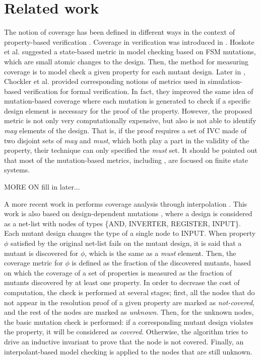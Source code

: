 \section{Related work}
\label{sec:related}

The notion of coverage has been defined in different ways in the context of property-based verification \cite{chockler2008causes, chockler2006coverage, chockler_coverage_2003, katz1999have, grosse2007estimating, claessen2007coverage}.
Coverage in verification was introduced in \cite{hoskote1999coverage, katz1999have}. Hoskote et al. \cite{hoskote1999coverage} suggested a state-based metric in model checking based on FSM mutations, which are small atomic changes to the design. Then, the method for measuring coverage is to model check a given property for each mutant design.
Later in \cite{chockler_coverage_2003}, Chockler et al. provided corresponding notions of metrics used in simulation-based verification for formal verification. In fact, they improved the same idea of mutation-based coverage where each mutation is generated to check if a specific
design element is necessary for the proof of the property.
 However, the proposed metric is not only very computationally expensive, but also is not able to identify \emph{may} elements of the design. That is, if the proof requires a set of IVC made of two disjoint sets of \emph{may} and \emph{must}, which both play a part in the validity of the property, their technique can only specified the \emph{must} set. It should be pointed out that most of the mutation-based metrics, including \cite{kupferman_theory_2008, chockler2001practical}, are focused on finite state systems.

 MORE ON \cite{Kupferman:2006:SCF} fill in later...

A more recent work in \cite{chockler2010coverage} performs coverage analysis through interpolation \cite{mcmillan2003interpolation}. This work is also based on design-dependent mutations \cite{chockler_coverage_2003}, where a design is considered as a net-list with nodes of types \{AND, INVERTER, REGISTER, INPUT\}. Each mutant design changes the type of a single node to INPUT. When property $\phi$ satisfied by the original net-list fails on the mutant design, it is said that a mutant is discovered for $\phi$, which is the same as a \emph{must} element.
Then, the coverage metric for $\phi$ is defined as the fraction of the discovered mutants, based on which the coverage of a set of properties is measured as the fraction of mutants discovered by at least one property.
In order to decrease the cost of computation, the check is performed at several stages; first, all the nodes that do not appear in the resolution proof of a given property are marked as \emph{not-covered}, and the rest of the nodes are marked as \emph{unknown}. Then, for the unknown nodes, the basic mutation check is performed: if a corresponding mutant design violates the property, it will be considered as \emph{covered}. Otherwise, the algorithm tries to drive an inductive invariant to prove that the node is not covered. Finally, an interpolant-based model checking is applied to the nodes that are still unknown.

